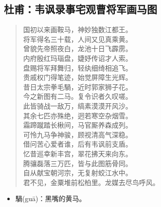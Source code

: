 \documentclass[12pt,oneside]{book}
\newenvironment{shici}{%
\begin{verse}\centering\yanti\large\hspace{12pt}}{\end{verse}}
\begin{document}
\begin{common-format}
\chapter{杜甫：韦讽录事宅观曹将军画马图}
\begin{shici}
国初以来画鞍马，神妙独数江都王。\\
将军得名三十载，人间又见真乘黄。\\
曾貌先帝照夜白，龙池十日飞霹雳。\\
内府殷红玛瑙盘，婕妤传诏才人索。\\
盘赐将军拜舞归，轻纨细绮相追飞。\\
贵戚权门得笔迹，始觉屏障生光辉。\\
昔日太宗拳毛騧，近时郭家狮子花。\\
今之新图有二马。复令识者久叹嗟。\\
此皆骑战一敌万，缟素漠漠开风沙。\\
其余七匹亦殊绝，迥若寒空杂烟雪。\\
霜蹄蹴踏长楸间，马官厮养森成列。\\
可怜九马争神骏，顾视清高气深稳。\\
借问苦心爱者谁，后有韦讽前支盾。\\
忆昔巡幸新丰宫，翠花拂天来向东。\\
腾骧磊落三万匹，皆与此图筋骨同。\\
自从献宝朝河宗，无复射蛟江水中。\\
君不见，金粟堆前松柏里。龙媒去尽鸟呼风。
\end{shici}

\begin{itemize}
\item 騧(guā)：黑嘴的黄马。
\end{itemize}


\end{common-format}
\end{document}
